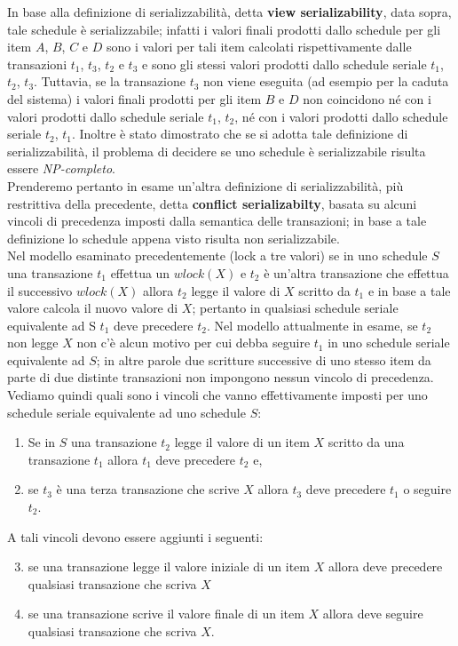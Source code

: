 In base alla definizione di serializzabilità, detta \textbf{view serializability}, data sopra, tale schedule è
serializzabile; infatti i valori finali prodotti dallo schedule per gli item $A$, $B$, $C$ e $D$ sono i valori per
tali item calcolati rispettivamente dalle transazioni $t_1$, $t_3$, $t_2$ e $t_3$ e sono gli stessi valori prodotti
dallo schedule seriale $t_1$, $t_2$, $t_3$. Tuttavia, se la transazione $t_3$ non viene eseguita (ad esempio per la
caduta del sistema) i valori finali prodotti per gli item $B$ e $D$ non coincidono né con i valori prodotti
dallo schedule seriale $t_1$, $t_2$, né con i valori prodotti dallo schedule seriale $t_2$, $t_1$.
Inoltre è stato dimostrato che se si adotta tale definizione di serializzabilità, il problema di decidere
se uno schedule è serializzabile risulta essere \emph{NP-completo}.\\
Prenderemo pertanto in esame un'altra definizione di serializzabilità, più restrittiva della
precedente, detta \textbf{conflict serializabilty}, basata su alcuni vincoli di precedenza imposti dalla
semantica delle transazioni; in base a tale definizione lo schedule appena visto risulta non
serializzabile.\\
Nel modello esaminato precedentemente (lock a tre valori) se in uno schedule $S$ una transazione $t_1$ effettua un
$wlock(X)$ e $t_2$ è un'altra transazione che effettua il successivo $wlock(X)$ allora $t_2$ legge il valore di
$X$ scritto da $t_1$ e in base a tale valore calcola il nuovo valore di $X$; pertanto in qualsiasi schedule
seriale equivalente ad S $t_1$ deve precedere $t_2$. Nel modello attualmente in esame, se $t_2$ non legge $X$
non c'è alcun motivo per cui debba seguire $t_1$ in uno schedule seriale equivalente ad $S$; in altre
parole due scritture successive di uno stesso item da parte di due distinte transazioni non
impongono nessun vincolo di precedenza. Vediamo quindi quali sono i vincoli che vanno
effettivamente imposti per uno schedule seriale equivalente ad uno schedule $S$:
\begin{enumerate}
 \item Se in $S$ una transazione $t_2$ legge il valore di un item $X$ scritto da una transazione $t_1$ allora $t_1$
deve precedere $t_2$ e,
 \item se $t_3$ è una terza transazione che scrive $X$ allora $t_3$ deve precedere $t_1$ o seguire $t_2$.
\end{enumerate}
A tali vincoli devono essere aggiunti i seguenti:
\begin{enumerate}
\setcounter{enumi}{2}
\item se una transazione legge il valore iniziale di un item $X$ allora deve precedere qualsiasi
transazione che scriva $X$
\item se una transazione scrive il valore finale di un item $X$ allora deve seguire qualsiasi transazione
che scriva $X$.
\end{enumerate}

